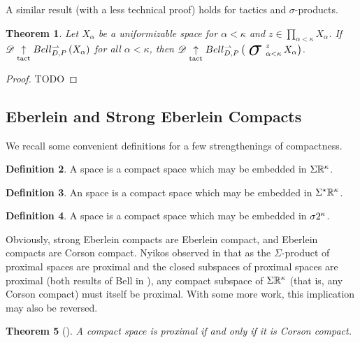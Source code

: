 \documentclass{amsart}
\newtheorem{theorem}{Theorem}[section]
\theoremstyle{definition}
\newtheorem{definition}[theorem]{Definition}
\begin{document}
  A similar result (with a less technical proof) holds for tactics and
  \(\sigma\)-products.

  \begin{theorem}
    Let \(X_\alpha\) be a uniformizable space for \(\alpha<\kappa\)
    and \(z\in \prod_{\alpha<\kappa}X_\alpha\).
    If
    \(\mathscr{D}\underset{\text{tact}}{\uparrow}Bell_{D,P}^{\rightharpoonup}\left({X_\alpha}\right)\) for all \(\alpha<\kappa\),
    then
    \(\pl D\tactwin\bellConGame{\sigmaProd_{\alpha<\kappa}^z X_\alpha}\).
  \end{theorem}

  \begin{proof}
    TODO
  \end{proof}

\subsection{Eberlein and Strong Eberlein Compacts}

  We recall some convenient definitions for a few strengthenings of
  compactness.

  \begin{definition}
    A  space is a compact space which may be embedded in
    \(\Sigma\mathbb{R}^{\kappa}\).
  \end{definition}

  \begin{definition}
    An  space is a compact space which may be embedded
    in \(\Sigma^\star\mathbb{R}^{\kappa}\).
  \end{definition}

  \begin{definition}
    A  space is a compact space which may
    be embedded in \(\sigma2^{\kappa}\).
  \end{definition}

  Obviously, strong Eberlein compacts are Eberlein compact, and Eberlein
  compacts are Corson compact. Nyikos observed in
  \cite{MR3288115} that as the \(\Sigma\)-product of proximal spaces
  are proximal and the closed subspaces of proximal spaces are proximal (both
  results of Bell in \cite{MR3239205}),
  any compact subspace of \(\Sigma\mathbb{R}^{\kappa}\) (that is, any Corson compact)
  must itself be proximal. With some more work, this implication may also
  be reversed.

  \begin{theorem}[\cite{MR3227201}]
    A compact space is proximal if and only if it is Corson compact.
  \end{theorem}
\end{document}
